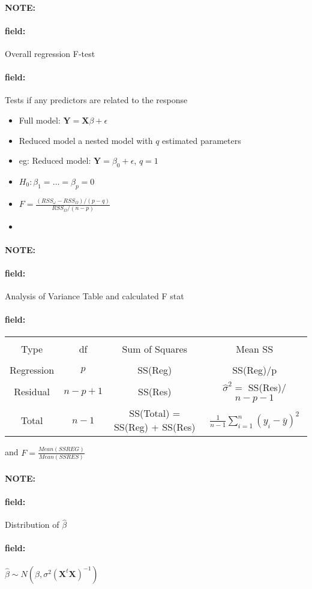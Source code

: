 \documentclass[12pt]{article}
\newenvironment{note}{\paragraph{NOTE:}}{}
\newenvironment{field}{\paragraph{field:}}{}
\begin{document}
\begin{note}
  \begin{field}
    Overall regression F-test
  \end{field}
  \begin{field}
    Tests if any predictors are related to the response
    \begin{itemize}
      \item Full model: $\mathbf{Y} = \mathbf{X}\beta + \epsilon$
      \item Reduced model a nested model with $q$ estimated parameters
      \item eg: Reduced model: $\mathbf{Y} = \beta_0 + \epsilon$, $q = 1$
      \item $H_0: \beta_1 =  \ldots = \beta_p = 0$
      \item $F = \frac{(RSS_\omega - RSS_\Omega)/(p-q)}{RSS_\Omega/(n-p)}$
      \item
    \end{itemize}
  \end{field}
\end{note}

\begin{note}
  \begin{field}
    Analysis of Variance Table and calculated F stat
  \end{field}
  \begin{field}
\begin{tabular}{|c|c|c|c|}
  \hline \\
  Type & df & Sum of Squares & Mean SS\\
  \hline \\
  Regression & $p$ & SS(Reg) & SS(Reg)/p\\
  Residual & $n-p+1$ & SS(Res) & $\hat{\sigma}^2 =$ SS(Res)/$n-p-1$\\
  Total & $n-1$ & SS(Total) = SS(Reg) + SS(Res) & $\frac{1}{n-1} \sum_{i=1}^n (y_i - \bar{y})^2$\\
  \hline
\end{tabular}
and $F = \frac{Mean(SSREG)}{Mean(SSRES)}$
\end{field}
\end{note}

\begin{note}
  \begin{field}
    Distribution of $\hat{\beta}$
  \end{field}
  \begin{field}
    $\hat{\beta} \sim N(\beta, \sigma^2(\mathbf{X}^t \mathbf{X})^{-1})$
  \end{field}
\end{note}
\end{document}
